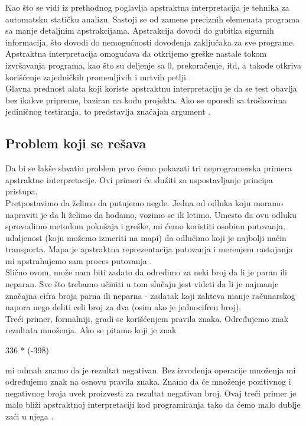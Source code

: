 
Kao što se vidi iz prethodnog poglavlja apstraktna interpretacija je tehnika za automatsku statičku analizu. Sastoji se od zamene preciznih elemenata programa sa manje detaljnim apstrakcijama. Apstrakcija dovodi do gubitka sigurnih informacija, što dovodi do nemogućnosti dovođenja zaključaka za sve programe. Apstraktna interpretacija omogućava da otkrijemo greške nastale tokom izvršavanja programa, kao što su deljenje sa 0, prekoračenje, itd, a takođe otkriva korišćenje zajedničkih promenljivih i mrtvih petlji \cite{AbramskyHankin}. \\ 

Glavna prednost alata koji koriste apstraktnu interpretaciju je da se test obavlja bez ikakve pripreme, baziran na kodu projekta. Ako se uporedi sa troškovima jediničnog testiranja, to predstavlja značajan argument \cite{AbramskyHankin}. \\


\subsection{Problem koji se rešava}
\label{subsec:problem1}
Da bi se lakše shvatio problem prvo ćemo pokazati tri neprogramerska primera apstraktne interpretacije. Ovi primeri će služiti za uspostavljanje principa pristupa. \\

Pretpostavimo da želimo da putujemo negde. Jedna od odluka koju moramo napraviti je da li želimo da hodamo, vozimo se ili letimo. Umesto da ovu odluku sprovodimo metodom pokušaja i greške, mi ćemo koristiti osobinu putovanja, udaljenost (koju možemo izmeriti na mapi) da odlučimo koji je najbolji način transporta. Mapa je apstraktna reprezentacija putovanja i merenjem rastojanja mi apstrahujemo sam proces putovanja \cite{AbramskyHankin}. \\

Slično ovom, može nam biti zadato da odredimo za neki broj da li je paran ili neparan. Sve što trebamo učiniti u tom slučaju jest videti da li je najmanje značajna cifra broja parna ili neparna - zadatak koji
zahteva manje računarskog napora nego deliti celi broj za dva (osim ako je jednocifren broj). \\


Treći primer, formalniji, gradi se korišćenjem pravila znaka. Određujemo znak rezultata množenja. Ako se pitamo koji je znak

336 * (-398)  

mi odmah znamo da je rezultat negativan. Bez izvođenja operacije množenja mi određujemo znak na osnovu pravila znaka. Znamo da će množenje pozitivnog i negativnog broja uvek proizvesti za rezultat negativan broj. Ovaj treći primer je malo bliži apstraktnoj interpretaciji kod programiranja tako da ćemo malo dublje zaći u njega \cite{AbramskyHankin}. \\

